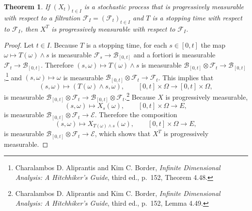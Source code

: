 \documentclass{article}
\newtheorem{theorem}{Theorem}
\theoremstyle{definition}
\begin{document}
\begin{theorem}
If $(X_t)_{t \in I}$ is a stochastic process  that is progressively measurable with respect
to a filtration $\mathscr{F}_I = (\mathscr{F}_t)_{t \in I}$ and 
 $T$ is a stopping time with respect
to $\mathscr{F}_I$, then
$X^T$ is  progressively measurable with respect to $\mathscr{F}_I$.
\end{theorem}
\begin{proof}
Let $t \in I$. 
Because $T$ is a stopping time, for each $s \in [0,t]$ the map $\omega \mapsto T(\omega) \wedge s$ 
is measurable $\mathscr{F}_s \to \mathscr{B}_{[0,t]}$ and a fortiori is measurable $\mathscr{F}_t \to  \mathscr{B}_{[0,t]}$. 
Therefore  $(s,\omega) \mapsto T(\omega) \wedge s$
is measurable $\mathscr{B}_{[0,t]} \otimes \mathscr{F}_t \to \mathscr{B}_{[0,t]}$,\footnote{Charalambos D. Aliprantis and Kim C. Border, {\em Infinite Dimensional Analysis:
A Hitchhiker's Guide}, third ed., p.~152, Theorem 4.48.} and 
$(s,\omega) \mapsto \omega$ is measurable $\mathscr{B}_{[0,t]} \otimes \mathscr{F}_t \to \mathscr{F}_t$. 
This implies that
\[
(s,\omega) \mapsto (T(\omega) \wedge s,\omega), \qquad [0,t] \times \Omega \to [0,t] \times \Omega,
\]
is measurable 
$\mathscr{B}_{[0,t]} \otimes \mathscr{F}_t \to \mathscr{B}_{[0,t]} \otimes \mathscr{F}_t$.\footnote{Charalambos D. Aliprantis and Kim C. Border, {\em Infinite Dimensional Analysis:
A Hitchhiker's Guide}, third ed., p.~152, Lemma 4.49.}
Because $X$ is progressively measurable,
\[
(s,\omega) \mapsto X_s(\omega), \qquad [0,t] \times \Omega \to E,
\]
is measurable $\mathscr{B}_{[0,t]} \otimes \mathscr{F}_t \to \mathscr{E}$.  Therefore
the composition 
\[
(s,\omega) \mapsto X_{T(\omega) \wedge s}(\omega), \qquad [0,t] \times \Omega \to E,
\]
is measurable $\mathscr{B}_{[0,t]} \otimes \mathscr{F}_t  \to \mathscr{E}$, which shows that
$X^T$ is progressively measurable.
\end{proof}
\end{document}
